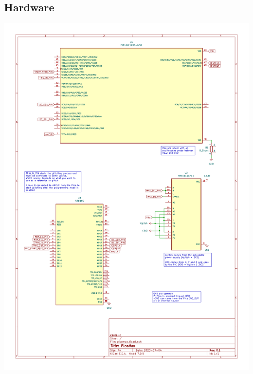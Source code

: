 \documentclass[a4paper,english,twoside,10pt]{article}
\begin{document}
\clearpage%
\begin{appendix}
\section{Hardware}\label{app:hardware}
\begin{center}
	\includegraphics[height=.95\textheight]{../hardware/schematic.pdf}
\end{center}
\end{appendix}
\end{document}
